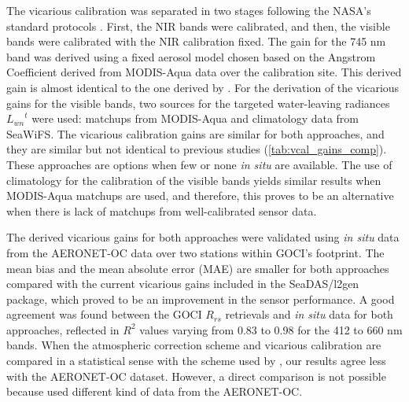 \documentclass[10pt]{article}
\begin{document}
The vicarious calibration was separated in two stages following the NASA's standard protocols \cite{Franz:07}.
First, the NIR bands were calibrated, and then, the visible bands were calibrated with the NIR calibration fixed.
The gain for the 745 nm band was derived using a fixed aerosol model chosen based on the Angstrom Coefficient derived from MODIS-Aqua data over the calibration site.
This derived gain is almost identical to the one derived by \cite{Wang:13}.
For the derivation of the vicarious gains for the visible bands, two sources for the targeted water-leaving radiances ${L_{wn}}^t$ were used: matchups from MODIS-Aqua and climatology data from SeaWiFS.
The vicarious calibration gains are similar for both approaches, and they are similar but not identical to previous studies (\autoref{tab:vcal_gains_comp}).
These approaches are options when few or none {\it in situ} are available.
The use of climatology for the calibration of the visible bands yields similar results when MODIS-Aqua matchups are used, and therefore, this proves to be an alternative when there is lack of matchups from well-calibrated sensor data.

The derived vicarious gains for both approaches were validated using {\it in situ} data from the AERONET-OC data over two stations within GOCI's footprint.
The mean bias and the mean absolute error (MAE) are smaller for both approaches compared with the current vicarious gains included in the SeaDAS/l2gen package, which proved to be an improvement in the sensor performance.
A good agreement was found between the GOCI $R_{rs}$ retrievals and {\it in situ} data for both approaches, reflected in $R^2$ values varying from 0.83 to 0.98 for the 412 to 660 nm bands.
When the atmospheric correction scheme and vicarious calibration are compared in a statistical sense with the scheme used by \cite{Ahn2015}, our results agree less with the AERONET-OC dataset. However, a direct comparison is not possible because \cite{Ahn2015} used different kind of data from the AERONET-OC.
\end{document}

